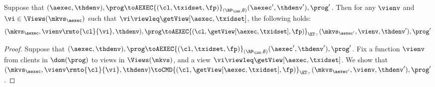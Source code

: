 \begin{proposition}
\label{prop:aexec2kv_transition}
Suppose that $(\aexec, \thdenv), \prog \toAEXEC{(\cl, \txidset, \fp)}_{(\RP_{\LWW}, \emptyset)} (\aexec', \thdenv'), \prog'$. 
Then for any $\vienv$ and $\vi \in \Views(\mkvs_{\aexec})$ such that $\vi \viewleq \getView[\aexec, \txidset]$, 
the following holds:
\[
    (\mkvs_{\aexec}, \vienv\rmto{\cl}{\vi}, \thdenv), \prog 
    \toAEXEC{(\cl, \getView[\aexec, \txidset], \fp)}_{\ET_{\top}} (\mkvs_{\aexec'}, \vienv, \thdenv'), \prog'
\]
\end{proposition}
\begin{proof}
Suppose that $(\aexec, \thdenv), \prog \toAEXEC{(\cl, \txidset, \fp)}_{(\RP_{\LWW}, \emptyset)} (\aexec', \thdenv'), \prog'$. 
Fix a function $\vienv$ from clients in $\dom(\prog)$ to views in $\Views(\mkvs)$, and a view $\vi \viewleq \getView[\aexec, \txidset]$.
We show that 
$(\mkvs_{\aexec}, \vienv\rmto{\cl}{\vi}, \thdenv) \toCMD{(\cl, \getView[\aexec, \txidset], \fp)}_{\ET_{\top}} (\mkvs_{\aexec'}, 
\vienv, \thdenv'), \prog'$. 


\end{proof}
